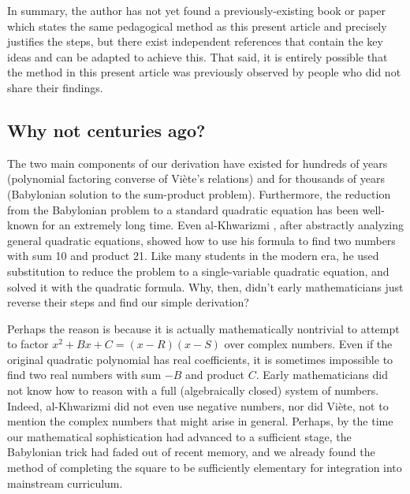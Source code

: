 In summary, the author has not yet found a previously-existing book or paper
which states the same pedagogical method as this present article and precisely
justifies the steps, but there exist independent references that contain the
key ideas and can be adapted to achieve this. That said, it is entirely
possible that the method in this present article was previously observed by
people who did not share their findings.


\subsection{Why not centuries ago?}

The two main components of our derivation have existed for hundreds of years
(polynomial factoring converse of Vi\`ete's relations) and for thousands of
years (Babylonian solution to the sum-product problem). Furthermore, the
reduction from the Babylonian problem to a standard quadratic equation has been
well-known for an extremely long time.  Even al-Khwarizmi \cite{al-khwarizmi},
after abstractly analyzing general quadratic equations, showed how to use his
formula to find two numbers with sum 10 and product 21. Like many students in
the modern era, he used substitution to reduce the problem to a single-variable
quadratic equation, and solved it with the quadratic formula. Why, then, didn't
early mathematicians just reverse their steps and find our simple derivation?

Perhaps the reason is because it is actually mathematically nontrivial to
attempt to factor $x^2 + Bx + C = (x - R)(x - S)$ over complex numbers.  Even if
the original quadratic polynomial has real coefficients, it is sometimes
impossible to find two real numbers with sum $-B$ and product $C$.  Early
mathematicians did not know how to reason with a full (algebraically closed)
system of numbers. Indeed, al-Khwarizmi did not even use negative numbers, nor
did Vi\`ete, not to mention the complex numbers that might arise in general.
Perhaps, by the time our mathematical sophistication had advanced to a
sufficient stage, the Babylonian trick had faded out of recent memory, and we
already found the method of completing the square to be sufficiently elementary
for integration into mainstream curriculum.

